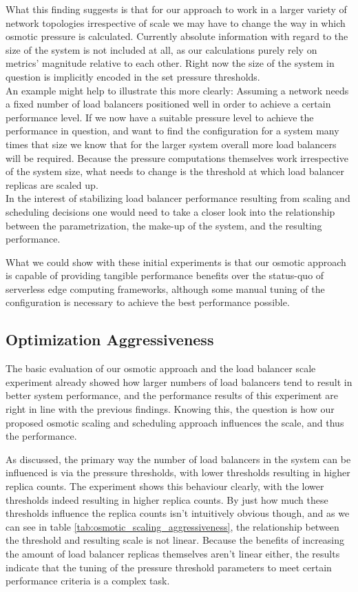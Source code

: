 What this finding suggests is that for our approach to work in a larger variety of network topologies irrespective of scale we may have to change the way in which osmotic pressure is calculated.
Currently absolute information with regard to the size of the system is not included at all, as our calculations purely rely on metrics' magnitude relative to each other.
Right now the size of the system in question is implicitly encoded in the set pressure thresholds.\\
An example might help to illustrate this more clearly: Assuming a network needs a fixed number of load balancers positioned well in order to achieve a certain performance level.
If we now have a suitable pressure level to achieve the performance in question, and want to find the configuration for a system many times that size we know that for the larger system overall more load balancers will be required.
Because the pressure computations themselves work irrespective of the system size, what needs to change is the threshold at which load balancer replicas are scaled up. \\
In the interest of stabilizing load balancer performance resulting from scaling and scheduling decisions one would need to take a closer look into the relationship between the parametrization,  the make-up of the system, and the resulting performance.

What we could show with these initial experiments is that our osmotic approach is capable of providing tangible performance benefits over the status-quo of serverless edge computing frameworks, although some manual tuning of the configuration is necessary to achieve the best performance possible.

\subsection{Optimization Aggressiveness}
The basic evaluation of our osmotic approach and the load balancer scale experiment already showed how larger numbers of load balancers tend to result in better system performance, and the performance results of this experiment are right in line with the previous findings.
Knowing this, the question is how our proposed osmotic scaling and scheduling approach influences the scale, and thus the performance.

As discussed, the primary way the number of load balancers in the system can be influenced is via the pressure thresholds, with lower thresholds resulting in higher replica counts.
The experiment shows this behaviour clearly, with the lower thresholds indeed resulting in higher replica counts.
By just how much these thresholds influence the replica counts isn't intuitively obvious though, and as we can see in table \ref{tab:osmotic_scaling_aggressiveness}, the relationship between the threshold and resulting scale is not linear.
Because the benefits of increasing the amount of load balancer replicas themselves aren't linear either, the results indicate that the tuning of the pressure threshold parameters to meet certain performance criteria is a complex task.

